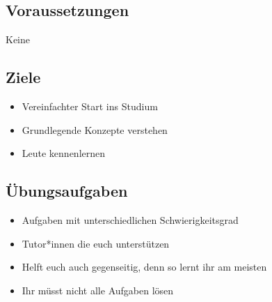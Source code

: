 \subsection{Voraussetzungen}
\begin{frame}
    \slidehead
    \centering
    \vspace{1.5cm}
    \Huge Keine
\end{frame}

\subsection{Ziele}
\begin{frame}
    \slidehead
    \begin{itemize}
        \item Vereinfachter Start ins Studium
        \item Grundlegende Konzepte verstehen
        \item Leute kennenlernen

    \end{itemize}
\end{frame}

\subsection{Übungsaufgaben}
\begin{frame}
    \slidehead
    \begin{itemize}
        \item Aufgaben mit unterschiedlichen Schwierigkeitsgrad
        \item Tutor*innen
            die euch unterstützen
        \item Helft euch auch gegenseitig, denn so lernt ihr am meisten
        \item Ihr müsst nicht alle Aufgaben lösen
    \end{itemize}
\end{frame}

